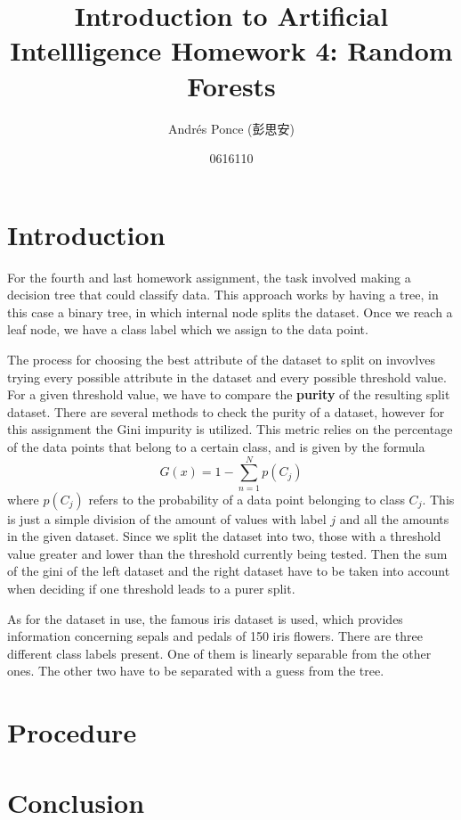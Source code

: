 \documentclass{article}
\title{Introduction to Artificial Intellligence Homework 4: Random Forests}
\author{Andr\'es Ponce (彭思安) \\
\and
0616110
}
\begin{document}
\maketitle
\section{Introduction}
For the fourth and last homework assignment, the task involved making a decision tree that could classify data.
This approach works by having a tree, in this case a binary tree, in which internal node splits the dataset.
Once we reach a leaf node, we have a class label which we assign to the data point.

The process for choosing the best attribute of the dataset to split on invovlves trying every possible attribute
	in the dataset and every possible threshold value.
For a given threshold value, we have to compare the \textbf{purity} of the resulting split dataset.
There are several methods to check the purity of a dataset, however for this assignment the Gini impurity 
	is utilized.
This metric relies on the percentage of the data points that belong to a certain class, and is given by the 
	formula
\begin{equation}
 G(x) = 1 - \sum_{n=1}^{N}p(C_{j})
\end{equation}
where $p(C_{j})$ refers to the probability of a data point belonging to class $C_{j}$. 
This is just a simple division of the amount of values with label $j$ and all the amounts in the given dataset.
Since we split the dataset into two, those with a threshold value greater and lower than the threshold 
	currently being tested.
Then the sum of the gini of the left dataset and the right dataset have to be taken into account when 
	deciding if one threshold leads to a purer split.

As for the dataset in use, the famous iris dataset is used, which provides information concerning sepals and 
	pedals of 150 iris flowers.
There are three different class labels present. One of them is linearly separable from the other ones. The other
two have to be separated with a guess from the tree.
\section{Procedure}
\section{Conclusion}
\end{document}
